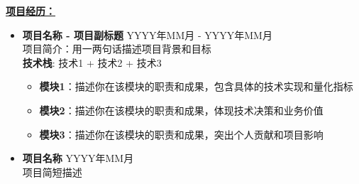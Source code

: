 \documentclass[UTF8]{ctexart}
\begin{document}
\medskip
{\large \textbf{\underline{项目经历：}}}\\
\begin{itemize}

\item \textbf{项目名称 - 项目副标题} \hfill{YYYY年MM月 - YYYY年MM月}\\
\smallskip
\small
项目简介：用一两句话描述项目背景和目标\\
\textbf{技术栈}: 技术1 + 技术2 + 技术3
\begin{itemize}
\small
\item \textbf{模块1}：描述你在该模块的职责和成果，包含具体的技术实现和量化指标
\item \textbf{模块2}：描述你在该模块的职责和成果，体现技术决策和业务价值
\item \textbf{模块3}：描述你在该模块的职责和成果，突出个人贡献和项目影响
\end{itemize}
\normalsize

\item \textbf{项目名称} \hfill{YYYY年MM月}\\
\smallskip
\small 项目简短描述
\normalsize

\end{itemize}
\end{document}
